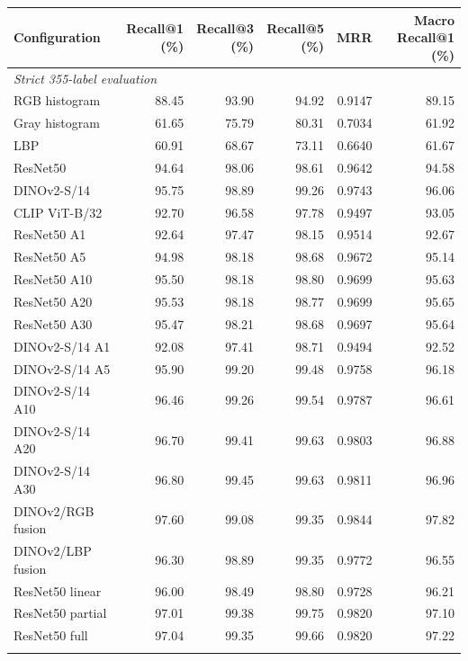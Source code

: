\begin{tabular}{lrrrrr}
\toprule
Configuration & \makecell{Recall@1\\(\%)} & \makecell{Recall@3\\(\%)} & \makecell{Recall@5\\(\%)} & MRR & \makecell{Macro\\Recall@1 (\%)} \\
\midrule
\multicolumn{6}{l}{\textit{Strict 355-label evaluation}}\\
RGB histogram & 88.45 & 93.90 & 94.92 & 0.9147 & 89.15 \\
Gray histogram & 61.65 & 75.79 & 80.31 & 0.7034 & 61.92 \\
LBP & 60.91 & 68.67 & 73.11 & 0.6640 & 61.67 \\
ResNet50 & 94.64 & 98.06 & 98.61 & 0.9642 & 94.58 \\
DINOv2-S/14 & 95.75 & 98.89 & 99.26 & 0.9743 & 96.06 \\
CLIP ViT-B/32 & 92.70 & 96.58 & 97.78 & 0.9497 & 93.05 \\
ResNet50 A1 & 92.64 & 97.47 & 98.15 & 0.9514 & 92.67 \\
ResNet50 A5 & 94.98 & 98.18 & 98.68 & 0.9672 & 95.14 \\
ResNet50 A10 & 95.50 & 98.18 & 98.80 & 0.9699 & 95.63 \\
ResNet50 A20 & 95.53 & 98.18 & 98.77 & 0.9699 & 95.65 \\
ResNet50 A30 & 95.47 & 98.21 & 98.68 & 0.9697 & 95.64 \\
DINOv2-S/14 A1 & 92.08 & 97.41 & 98.71 & 0.9494 & 92.52 \\
DINOv2-S/14 A5 & 95.90 & 99.20 & 99.48 & 0.9758 & 96.18 \\
DINOv2-S/14 A10 & 96.46 & 99.26 & 99.54 & 0.9787 & 96.61 \\
DINOv2-S/14 A20 & 96.70 & 99.41 & 99.63 & 0.9803 & 96.88 \\
DINOv2-S/14 A30 & 96.80 & 99.45 & 99.63 & 0.9811 & 96.96 \\
DINOv2/RGB fusion & 97.60 & 99.08 & 99.35 & 0.9844 & 97.82 \\
DINOv2/LBP fusion & 96.30 & 98.89 & 99.35 & 0.9772 & 96.55 \\
ResNet50 linear & 96.00 & 98.49 & 98.80 & 0.9728 & 96.21 \\
ResNet50 partial & 97.01 & 99.38 & 99.75 & 0.9820 & 97.10 \\
ResNet50 full & 97.04 & 99.35 & 99.66 & 0.9820 & 97.22 \\
\addlinespace[4pt]\midrule

\end{tabular}

